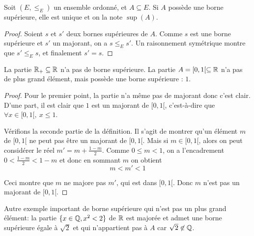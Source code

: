 \begin{proposition}
Soit $(E,\leq_E)$ un ensemble ordonné, et $A\subseteq E$. Si $A$ possède une borne supérieure, elle est unique et on la note $\sup(A)$.
\end{proposition}
\begin{proof}
Soient $s$ et $s'$ deux bornes supérieures de $A$. Comme $s$ est une borne supérieure et $s'$ un majorant, on a $s\leq_E s'$. Un raisonnement symétrique montre que  $s'\leq_E s$, et finalement $s'=s$.
\end{proof}

\begin{exemple}
La partie $\mathbb{R}_+ \subseteq \mathbb{R}$ n'a pas de borne supérieure. 
La partie $A=[0,1[ \subseteq \mathbb{R}$ n'a pas de plus grand élément, mais possède une borne supérieure : $1$.
\end{exemple}
\begin{proof} Pour le premier point, la partie n'a même pas de majorant donc c'est clair. 
D'une part, il est clair que $1$ est un majorant de $[0,1[$, c'est-à-dire que $\forall x\in [0,1[, \: x\leq 1$.

Vérifions la seconde partie de la définition.  Il s'agit de montrer qu'un élément $m$ de $[0,1[$ ne peut pas être un majorant de $[0,1[$. Mais si $m \in [0,1[$, alors on peut considérer le réel $m'=m+\frac{1-m}{2}$. Comme $0\leq m< 1$, on a l'encadrement $0< \frac{1-m}{2} < 1-m$ et donc en sommant $m$ on obtient
\[
m< m' < 1
\]
\begin{center}
\end{center}
Ceci montre que $m$ ne majore pas $m'$, qui est dans $[0,1[$. Donc $m$ n'est pas un majorant de $[0,1[$.
\end{proof}

Autre exemple important de borne supérieure qui n'est pas un plus grand élément: la partie $\{x\in \mathbb{Q}, x^2<2\}$ de $\mathbb{R}$ est majorée et admet une borne supérieure égale à $\sqrt 2$ et qui n'appartient pas à $A$ car $\sqrt2\not\in \mathbb{Q}$. 

